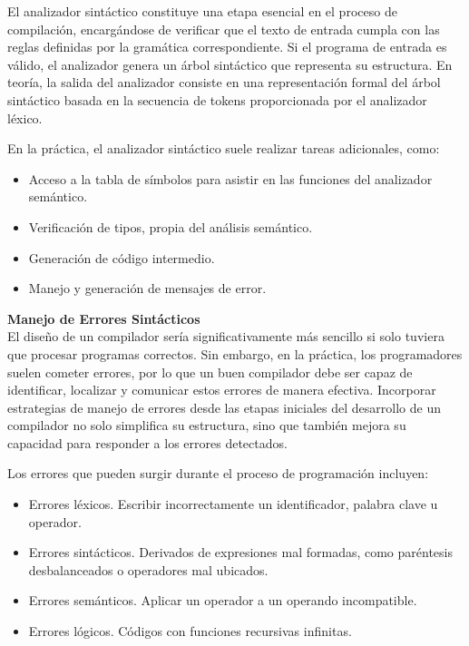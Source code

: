 \documentclass{article}
\begin{document}
El analizador sintáctico constituye una etapa esencial en el proceso de compilación, encargándose de verificar 
que el texto de entrada cumpla con las reglas definidas por la gramática correspondiente. Si el programa de 
entrada es válido, el analizador genera un árbol sintáctico que representa su estructura. En teoría, la salida 
del analizador consiste en una representación formal del árbol sintáctico basada en la secuencia de tokens 
proporcionada por el analizador léxico. 
 
En la práctica, el analizador sintáctico suele realizar tareas adicionales, como: 
\begin{itemize}
\item  Acceso a la tabla de símbolos para asistir en las funciones del analizador semántico. 
\item  Verificación de tipos, propia del análisis semántico. 
\item  Generación de código intermedio. 
\item  Manejo y generación de mensajes de error. 
\end{itemize}

\textbf{Manejo de Errores Sintácticos} \\
 
El diseño de un compilador sería significativamente más sencillo si solo tuviera que procesar programas 
correctos. Sin embargo, en la práctica, los programadores suelen cometer errores, por lo que un buen 
compilador debe ser capaz de identificar, localizar y comunicar estos errores de manera efectiva. Incorporar 
estrategias de manejo de errores desde las etapas iniciales del desarrollo de un compilador no solo simplifica 
su estructura, sino que también mejora su capacidad para responder a los errores detectados.

Los errores que pueden surgir durante el proceso de programación incluyen: 
\begin{itemize}
\item Errores léxicos. Escribir incorrectamente un identificador, palabra clave u operador. 
\item Errores sintácticos. Derivados de expresiones mal formadas, como paréntesis desbalanceados o 
operadores mal ubicados. 
\item Errores semánticos. Aplicar un operador a un operando incompatible. 
\item Errores lógicos. Códigos con funciones recursivas infinitas. 
\end{itemize}
    \newpage
\end{document}
